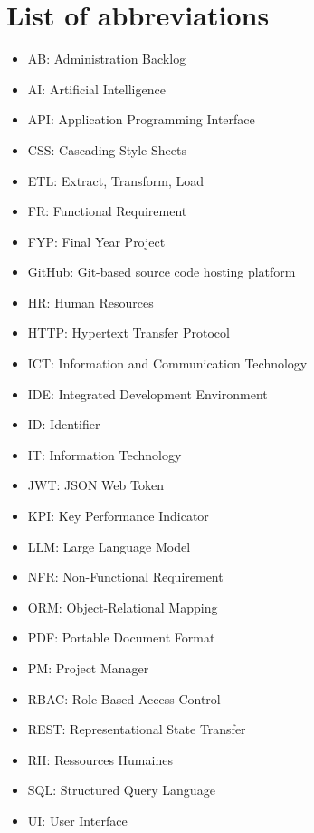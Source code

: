 \chapter*{List of abbreviations}
\mtcaddchapter
\begin{itemize}[noitemsep]
    \item AB: Administration Backlog
    \item AI: Artificial Intelligence
    \item API: Application Programming Interface
    \item CSS: Cascading Style Sheets
    \item ETL: Extract, Transform, Load
    \item FR: Functional Requirement
    \item FYP: Final Year Project
    \item GitHub: Git-based source code hosting platform
    \item HR: Human Resources
    \item HTTP: Hypertext Transfer Protocol
    \item ICT: Information and Communication Technology
    \item IDE: Integrated Development Environment
    \item ID: Identifier
    \item IT: Information Technology
    \item JWT: JSON Web Token
    \item KPI: Key Performance Indicator
    \item LLM: Large Language Model
    \item NFR: Non-Functional Requirement
    \item ORM: Object-Relational Mapping
    \item PDF: Portable Document Format
    \item PM: Project Manager
    \item RBAC: Role-Based Access Control
    \item REST: Representational State Transfer
    \item RH: Ressources Humaines
    \item SQL: Structured Query Language
    \item UI: User Interface
\end{itemize}
